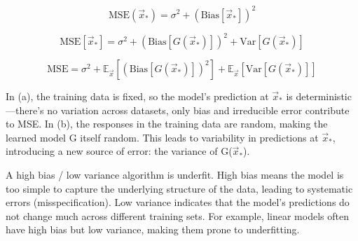 \documentclass[12pt]{article}
\begin{document}
\begin{enumerate}
\[
\text{MSE}(\vec{x}_*) = \sigma^2 + \left( \text{Bias}[\vec{x}_*] \right)^2
\]



\[
\text{MSE}[\vec{x}_*] = \sigma^2 + \left( \text{Bias}\left[ G(\vec{x}_*) \right] \right)^2 + \text{Var}\left[ G(\vec{x}_*) \right]
\]


\[
\text{MSE} = \sigma^2 + \mathbb{E}_{\vec{x}} \left[ \left( \text{Bias}\left[ G(\vec{x}_*) \right] \right)^2 \right] + \mathbb{E}_{\vec{x}} \left[ \text{Var}\left[ G(\vec{x}_*) \right] \right]
\]


In (a), the training data is fixed, so the model’s prediction at $\vec{x}_*$ is deterministic—there’s no variation across datasets, only bias and irreducible error contribute to MSE. In (b), the responses in the training data are random, making the learned model G itself random. This leads to variability in predictions at $\vec{x}_*$, introducing a new source of error: the variance of G($\vec{x}_*$).


A high bias / low variance algorithm is underfit. High bias means the model is too simple to capture the underlying structure of the data, leading to systematic errors (misspecification). Low variance indicates that the model’s predictions do not change much across different training sets. For example, linear models often have high bias but low variance, making them prone to underfitting.



\end{enumerate}
\end{document}
